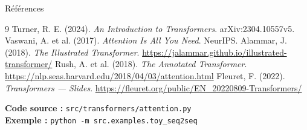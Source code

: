 \documentclass[aspectratio=169, 11pt]{beamer}
\begin{document}
\begin{frame}{Références}
\footnotesize
\begin{thebibliography}{9}
     Turner, R. E. (2024). \emph{An Introduction to Transformers}. arXiv:2304.10557v5.
     Vaswani, A. et al. (2017). \emph{Attention Is All You Need}. NeurIPS.
     Alammar, J. (2018). \emph{The Illustrated Transformer}. \url{https://jalammar.github.io/illustrated-transformer/}
     Rush, A. et al. (2018). \emph{The Annotated Transformer}. \url{https://nlp.seas.harvard.edu/2018/04/03/attention.html}
     Fleuret, F. (2022). \emph{Transformers --- Slides}. \url{https://fleuret.org/public/EN_20220809-Transformers/}
\end{thebibliography}

\vspace{1em}

\centering
\textbf{Code source :} \texttt{src/transformers/attention.py}\\
\textbf{Exemple :} \texttt{python -m src.examples.toy\_seq2seq}
\end{frame}
\end{document}
